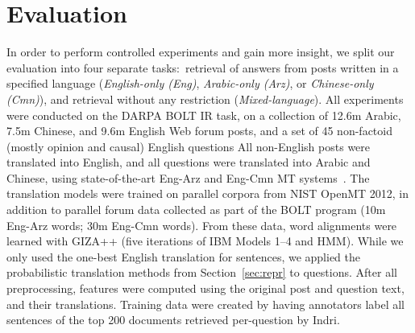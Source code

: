 \documentclass{sig-alternate-05-2015}
\newcommand{\ignore}[1]{}
\begin{document}
\section{Evaluation}\label{sec:eval}
In order to perform controlled experiments and gain more 
insight, we split our evaluation into four separate tasks:\ retrieval of answers from posts written in a specified language 
(\emph{English-only (Eng)}, \emph{Arabic-only (Arz)}, or \emph{Chinese-only (Cmn)}), and retrieval without any restriction
(\emph{Mixed-language}). 
All experiments were conducted on the DARPA BOLT IR task, on a collection of 12.6m Arabic, 
7.5m Chinese, and 9.6m English Web forum posts, and a 
set of 45 non-factoid (mostly opinion and causal) English questions
All non-English posts were translated into English, and all questions were translated into Arabic and Chinese,
using state-of-the-art Eng-Arz and Eng-Cmn MT systems~\cite{Devlin:2014}. 
The translation models were trained on parallel corpora from NIST OpenMT 2012, in addition to parallel forum 
data collected as part of the BOLT program (10m Eng-Arz words; 30m Eng-Cmn words). 
From these data, word alignments were learned with GIZA++ (five iterations of IBM Models 1--4 
and HMM). While we only used the 
one-best English translation for sentences, we applied the probabilistic translation methods from Section~\ref{sec:repr} 
to questions. 
After all preprocessing, features were computed using the original post and question text, and their translations.
Training data were created by having annotators label all sentences of the top 200 documents retrieved per-question by Indri.
\ignore{
Due to the nature of retrieval tasks, labels of the training data are usually unbalanced, with more negatively labeled sentences. 
In order to correct this, we split the data into balanced subsets (each sharing the same set of positively labeled data) 
and train multiple classifiers, then take a majority vote when predicting.
}
\end{document}
